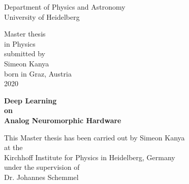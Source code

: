 \begin{titlepage}
	
	
	\thispagestyle{empty}
	\begin{center}
		\renewcommand{\baselinestretch}{2.00}
		\Large\sffamily
		Department of Physics and Astronomy\\
		\large University of Heidelberg
		\par\vfill\normalfont
		Master thesis\\
		in Physics\\
		submitted by\\
		Simeon Kanya\\
		born in Graz, Austria\\
		2020
	\end{center}	
	\cleardoublepage{}
	\thispagestyle{empty}
	\begin{center}
		\renewcommand{\baselinestretch}{2.00}
		\Large\bfseries\sffamily
		Deep Learning  \\
		on\\
		Analog Neuromorphic Hardware
		\par
		\vfill
		\large\normalfont
		This Master thesis has been carried out by Simeon Kanya\\
		at the\\
		Kirchhoff Institute for Physics in Heidelberg, Germany\\
		under the supervision of\\
		Dr. Johannes Schemmel
	\end{center}\par
	\vspace{0\baselineskip}
	
	\renewcommand{\baselinestretch}{1.00}\normalsize
\end{titlepage}


